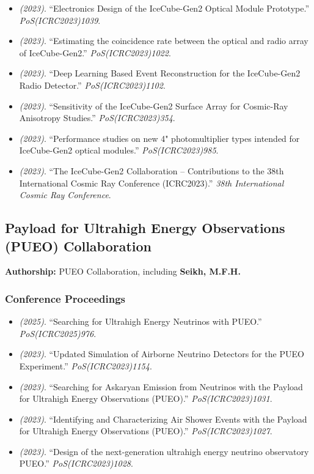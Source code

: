 \begin{itemize}
\item \textit{(2023)}. ``Electronics Design of the IceCube-Gen2 Optical Module Prototype.'' \textit{PoS(ICRC2023)1039}.  
\item \textit{(2023)}. ``Estimating the coincidence rate between the optical and radio array of IceCube-Gen2.'' \textit{PoS(ICRC2023)1022}.  
\item \textit{(2023)}. ``Deep Learning Based Event Reconstruction for the IceCube-Gen2 Radio Detector.'' \textit{PoS(ICRC2023)1102}.  
\item \textit{(2023)}. ``Sensitivity of the IceCube-Gen2 Surface Array for Cosmic-Ray Anisotropy Studies.'' \textit{PoS(ICRC2023)354}.  
\item \textit{(2023)}. ``Performance studies on new 4" photomultiplier types intended for IceCube-Gen2 optical modules.'' \textit{PoS(ICRC2023)985}.  
\item \textit{(2023)}. ``The IceCube-Gen2 Collaboration -- Contributions to the 38th International Cosmic Ray Conference (ICRC2023).'' \textit{38th International Cosmic Ray Conference}. 
\end{itemize}
\medskip

\subsection{Payload for Ultrahigh Energy Observations (PUEO) Collaboration}
\textbf{Authorship:} PUEO Collaboration, including \textbf{Seikh, M.F.H.}
\subsubsection{Conference Proceedings}
\begin{itemize}
\item \textit{(2025)}. ``Searching for Ultrahigh Energy Neutrinos with PUEO.'' \textit{PoS(ICRC2025)976}. 
\item \textit{(2023)}. ``Updated Simulation of Airborne Neutrino Detectors for the PUEO Experiment.'' \textit{PoS(ICRC2023)1154}. 
\item \textit{(2023)}. ``Searching for Askaryan Emission from Neutrinos with the Payload for Ultrahigh Energy Observations (PUEO).'' \textit{PoS(ICRC2023)1031}. 
\item \textit{(2023)}. ``Identifying and Characterizing Air Shower Events with the Payload for Ultrahigh Energy Observations (PUEO).'' \textit{PoS(ICRC2023)1027}. 
\item \textit{(2023)}. ``Design of the next-generation ultrahigh energy neutrino observatory PUEO.'' \textit{PoS(ICRC2023)1028}. 
\end{itemize}
